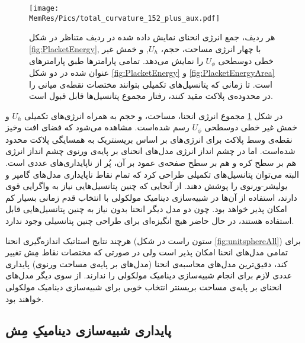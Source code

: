 \begin{figure}[htbp]
\begin{center}
\texttt{[image: \\MemRes/Pics/total\_curvature\_152\_plus\_aux.pdf]}
\caption{
هر ردیف، جمع انرژی انحنای نمایش داده شده در ردیف متناظر در  شکل
\ref{fig:PlacketEnergy},
با چهار انرژی مساحت، حجم، 
$U_h$,
و خمش غیر خطی دوسطحی 
$U_\phi$
را نمایش می‌دهد. تمامی‌ پارامتر‌ها طبق پارامتر‌های عنوان شده در دو شکل 
\ref{fig:PlacketEnergy}
و
\ref{fig:PlacketEnergyArea}
است. تا زمانی که پتانسیل‌های تکمیلی بتوانند مختصات نقطه‌ی میانی را در محدوده‌ی پلاکت مقید کنند، رفتار مجموع پتانسیل‌ها قابل قبول است. 
}
\label{fig:PlacketEnergyAll}
\end{center}
\end{figure}


در شکل 
\ref{fig:PlacketEnergyAll}
مجموع انرژی انحنا، مساحت، و حجم به همراه انرژی‌های تکمیلی 
$U_h$
و خمش غیر خطی دوسطحی 
$U_\phi$
رسم شده‌است. مشاهده می‌شود که فضای افت وخیز نقطه‌ی وسط پلاکت برای انرژی‌های بر اساس بریسنتریک به همسایگی پلاکت محدود شده‌است. اما در چشم انداز انرژی مدل‌های انحنای بر پایه‌ی ورنوی چشم انداز انرژی هم بر سطح کره و هم بر سطح صفحه‌ی عمود بر آن، پُر از ناپایداری‌های عددی است. البته می‌توان پتانسیل‌های تکمیلی طراحی کرد که تمام نقاط ناپایداری مدل‌های گامپر و یولیشر-ورنوی را پوشش دهند. از آنجایی که چنین پتانسیل‌هایی نیاز به واگرایی قوی دارند، استفاده از آن‌ها در شبیه‌سازی دینامیک مولکولی با انتخاب قدم زمانی بسیار کم امکان پذیر خواهد بود. چون دو مدل دیگر انحنا بدون نیاز به چنین پتانسیل‌هایی قابل استفاده هستند، در حال حاضر هیچ انگیزه‌ای برای طراحی چنین پتانسیلی وجود ندارد.

هرچند نتایج استاتیک اندازه‌گیری انحنا (ستون راست در شکل
\ref{fig:unitsphereAll})
 برای تمامی‌ مدل‌های انحنا امکان پذیر است ولی در صورتی که مختصات نقاط مِش تغییر کند، دقیق‌ترین مدل‌های محاسبه‌ی انحنا (مدل‌های بر پایه‌ی مساحت ورنوی) پایداری عددی لازم برای انجام شبیه‌سازی دینامیک مولکولی را ندارند. از سوی دیگر مدل‌های انحنای بر پایه‌ی مساحت بریسنتر انتخاب خوبی برای شبیه‌سازی دینامیک مولکولی خواهند بود.









\subsection{\label{sec:ResultsStability}
پایداری شبیه‌سازی دینامیکِ مِش
}

